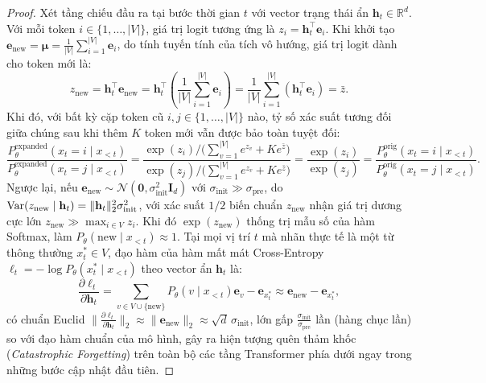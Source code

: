 \begin{proof}
Xét tầng chiếu đầu ra tại bước thời gian $t$ với vector trạng thái ẩn $\mathbf{h}_t \in \mathbb{R}^d$. Với mỗi token $i \in \{1, \dots, |V|\}$, giá trị logit tương ứng là $z_i = \mathbf{h}_t^\top \mathbf{e}_i$.
Khi khởi tạo $\mathbf{e}_{\text{new}} = \bm{\mu} = \frac{1}{|V|}\sum_{i=1}^{|V|} \mathbf{e}_i$, do tính tuyến tính của tích vô hướng, giá trị logit dành cho token mới là:
\begin{equation}
    z_{\text{new}} = \mathbf{h}_t^\top \mathbf{e}_{\text{new}} = \mathbf{h}_t^\top \left( \frac{1}{|V|}\sum_{i=1}^{|V|} \mathbf{e}_i \right) = \frac{1}{|V|}\sum_{i=1}^{|V|} (\mathbf{h}_t^\top \mathbf{e}_i) = \bar{z}.
\end{equation}
Khi đó, với bất kỳ cặp token cũ $i, j \in \{1, \dots, |V|\}$ nào, tỷ số xác suất tương đối giữa chúng sau khi thêm $K$ token mới vẫn được bảo toàn tuyệt đối:
\begin{equation}
    \frac{P_\theta^{\text{expanded}}(x_t = i \mid x_{<t})}{P_\theta^{\text{expanded}}(x_t = j \mid x_{<t})} = \frac{\exp(z_i) / \big(\sum_{v=1}^{|V|} e^{z_v} + K e^{\bar{z}}\big)}{\exp(z_j) / \big(\sum_{v=1}^{|V|} e^{z_v} + K e^{\bar{z}}\big)} = \frac{\exp(z_i)}{\exp(z_j)} = \frac{P_\theta^{\text{orig}}(x_t = i \mid x_{<t})}{P_\theta^{\text{orig}}(x_t = j \mid x_{<t})}.
\end{equation}
Ngược lại, nếu $\mathbf{e}_{\text{new}} \sim \mathcal{N}(\mathbf{0}, \sigma_{\text{init}}^2 \mathbf{I}_d)$ với $\sigma_{\text{init}} \gg \sigma_{\text{pre}}$, do $\operatorname{\mathrm{Var}}(z_{\text{new}} \mid \mathbf{h}_t) = \|\mathbf{h}_t\|_2^2 \sigma_{\text{init}}^2$, với xác suất $1/2$ biến chuẩn $z_{\text{new}}$ nhận giá trị dương cực lớn $z_{\text{new}} \gg \max_{i \in V} z_i$. Khi đó $\exp(z_{\text{new}})$ thống trị mẫu số của hàm Softmax, làm $P_\theta(\text{new} \mid x_{<t}) \approx 1$. Tại mọi vị trí $t$ mà nhãn thực tế là một từ thông thường $x_t^* \in V$, đạo hàm của hàm mất mát Cross-Entropy $\ell_t = -\log P_\theta(x_t^* \mid x_{<t})$ theo vector ẩn $\mathbf{h}_t$ là:
\begin{equation}
    \frac{\partial \ell_t}{\partial \mathbf{h}_t} = \sum_{v \in V \cup \{\text{new}\}} P_\theta(v \mid x_{<t})\mathbf{e}_v - \mathbf{e}_{x_t^*} \approx \mathbf{e}_{\text{new}} - \mathbf{e}_{x_t^*},
\end{equation}
có chuẩn Euclid $\|\frac{\partial \ell_t}{\partial \mathbf{h}_t}\|_2 \approx \|\mathbf{e}_{\text{new}}\|_2 \approx \sqrt{d}\,\sigma_{\text{init}}$, lớn gấp $\frac{\sigma_{\text{init}}}{\sigma_{\text{pre}}}$ lần (hàng chục lần) so với đạo hàm chuẩn của mô hình, gây ra hiện tượng quên thảm khốc (\textit{Catastrophic Forgetting}) trên toàn bộ các tầng Transformer phía dưới ngay trong những bước cập nhật đầu tiên.
\end{proof}

